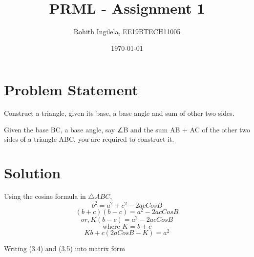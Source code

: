 \documentclass[letterpaper,12pt]{article}
\begin{document}
\pagecolor{white}
\color{black}
\title{PRML - Assignment 1}
\author{Rohith Ingilela, EE19BTECH11005}
\date{\today}
\maketitle



\section{Problem Statement}
Construct a triangle, given its base, a base angle and sum
of other two sides. \\
\vspace{10pt}

Given the base BC, a base angle, say ∠B and the sum AB + AC of the other two sides of a triangle ABC, you are required to construct it.
\begin{center}
\end{center}

\section{Solution}

Using the cosine formula in $\triangle ABC$,
\begin{equation}
    b^2 = a^2 + c^2 - 2ac Cos B    
\end{equation}
\begin{equation}
    (b + c)(b - c) = a^2 - 2ac Cos B
\end{equation}
\begin{equation}
    or, K(b - c) = a^2 - 2ac Cos B
\end{equation}
\begin{equation}
    \text{where }  K = b + c
\end{equation}
\begin{equation}
    Kb + c (2aCosB - K) = a^2
\end{equation}

    Writing (3.4) and (3.5) into matrix form
\end{document}
